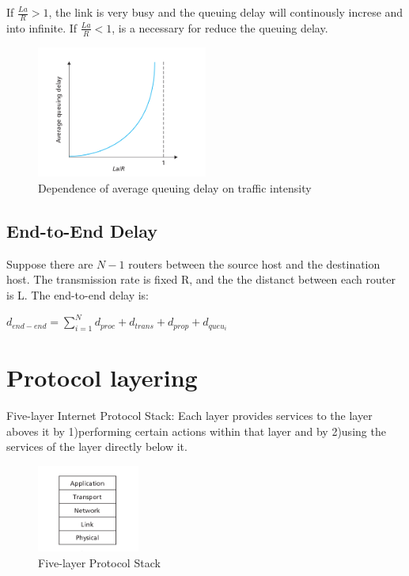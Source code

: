 If $\frac{La}{R} >1 $, the link is very busy and the queuing delay will continously increse and into infinite. If $\frac{La}{R} < 1$, is a necessary
for reduce the queuing delay.

\begin{figure}[!h]
    \centering
    \includegraphics[width=0.5\textwidth]{chapters/chapter1/Queuing_delay.png}
    \caption{Dependence of average queuing delay on traffic intensity}
    \label{c1_queuingDelay_trafficIntensity}
\end{figure}


\subsection{End-to-End Delay}
Suppose there are $N-1$ routers between the source host and
the destination host. The transmission rate is fixed R, and the the distanct between each router is L.
The end-to-end delay is:
\begin{center}
    $d_{end-end} = \sum_{i=1}^N d_{proc}+d_{trans}+d_{prop}+d_{queu_i}$
\end{center}

\section{Protocol layering}

Five-layer Internet Protocol Stack: Each layer provides services to the layer aboves it by 1)performing certain actions within that layer and by
2)using the services of the layer directly below it.


\begin{figure}[!h]
    \centering
    \includegraphics[width=0.3\textwidth]{chapters/chapter1/Layered.png}
    \caption{Five-layer Protocol Stack}
    \label{c1_protocol_stack}
\end{figure}

